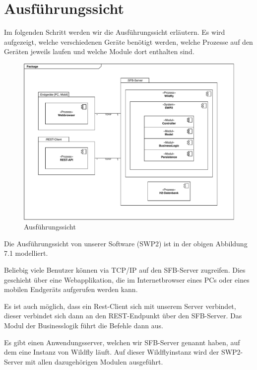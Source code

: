 \documentclass[enabledeprecatedfontcommands,fontsize=12pt,paper=a4,twoside]{scrartcl}
\begin{document}
{\begin{figure}
 \end{figure}
\newpage
\section{Ausführungssicht}

\label{sec:ausfuehrung}


{ Im folgenden Schritt werden wir die Ausführungssicht erläutern. Es wird aufgezeigt, welche verschiedenen Geräte benötigt werden, welche Prozesse auf den Geräten jeweils laufen und welche Module dort enthalten sind.
}


\begin{figure}[H]
\includegraphics[scale=0.5]{UML/06Ausfuehrungssicht.pdf}
 \caption{Ausführungssicht}
\end{figure}


{ Die Ausführungssicht von unserer Software (SWP2) ist in der obigen Abbildung
  7.1 modelliert.

Beliebig viele Benutzer können via TCP/IP auf den SFB-Server zugreifen. Dies
geschieht über eine Webapplikation, die im Internetbrowser eines PCs oder eines
mobilen Endgeräts aufgerufen werden kann.

Es ist auch möglich, dass ein Rest-Client sich mit unserem Server verbindet,
dieser verbindet sich dann an den REST-Endpunkt über den SFB-Server. Das Modul
der Businesslogik führt die Befehle dann aus.

Es gibt einen Anwendungsserver, welchen wir SFB-Server genannt haben, auf dem
eine Instanz von Wildfly läuft. Auf dieser Wildflyinstanz wird der SWP2-Server
mit allen dazugehörigen Modulen ausgeführt.

}}
\end{document}
